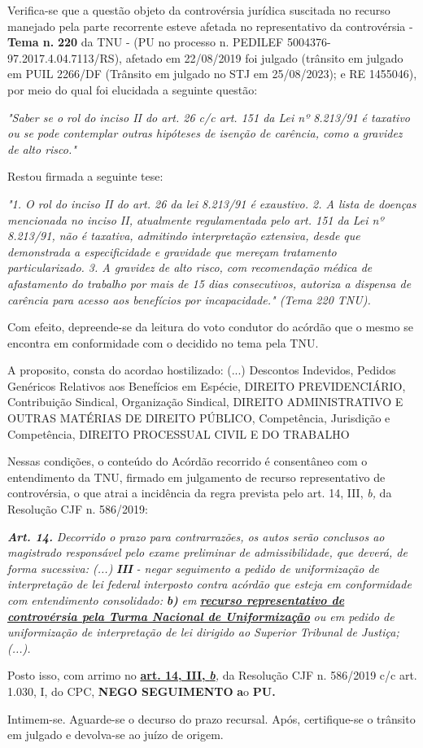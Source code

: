 \documentclass[12pt]{article}
\begin{document}
\justifying
\noindent Verifica-se que a questão objeto da controvérsia jurídica suscitada no recurso manejado pela parte recorrente esteve afetada no representativo da controvérsia - \textbf{Tema n. }\textbf{220} da TNU - (PU no processo n. PEDILEF 5004376-97.2017.4.04.7113/RS),  afetado em 22/08/2019 foi julgado (trânsito em julgado em PUIL 2266/DF (Trânsito em julgado no STJ em 25/08/2023);   e RE 1455046), por meio do qual foi elucidada a seguinte questão:

\noindent \textit{"Saber se o rol do inciso II do art. 26 c/c art. 151 da Lei nº 8.213/91 é taxativo ou se pode contemplar outras hipóteses de isenção de carência, como a gravidez de alto risco."}

\noindent Restou firmada a seguinte tese:

\noindent \textit{"1. O rol do inciso II do art. 26 da lei 8.213/91 é exaustivo. 2. A lista de doenças mencionada no inciso II, atualmente regulamentada pelo art. 151 da Lei nº 8.213/91, não é taxativa, admitindo interpretação extensiva, desde que demonstrada a especificidade e gravidade que mereçam tratamento particularizado. 3. A gravidez de alto risco, com recomendação médica de afastamento do trabalho por mais de 15 dias consecutivos, autoriza a dispensa de carência para acesso aos benefícios por incapacidade." (Tema 220 TNU).}

\noindent Com efeito, depreende-se da leitura do voto condutor do acórdão que o mesmo se encontra em conformidade com o decidido no  tema pela TNU.

\noindent A proposito, consta do acordao hostilizado: (...) Descontos Indevidos, Pedidos Genéricos Relativos aos Benefícios em Espécie, DIREITO PREVIDENCIÁRIO, Contribuição Sindical, Organização Sindical, DIREITO ADMINISTRATIVO E OUTRAS MATÉRIAS DE DIREITO PÚBLICO, Competência, Jurisdição e Competência, DIREITO PROCESSUAL CIVIL E DO TRABALHO

\noindent Nessas condições, o conteúdo do Acórdão recorrido é consentâneo com o entendimento da TNU, firmado em julgamento de recurso representativo de controvérsia, o que atrai a incidência da regra prevista pelo art. 14, III, \textit{b,} da Resolução CJF n. 586/2019:

\noindent \textit{\textbf{Art. 14.}}\textit{ Decorrido o prazo para contrarrazões, os autos serão conclusos ao magistrado responsável pelo exame preliminar de admissibilidade, que deverá, de forma sucessiva: (...) }\textit{\textbf{III }}\textit{- negar seguimento a pedido de uniformização de interpretação de lei federal interposto contra acórdão que esteja em conformidade com entendimento consolidado: }\textit{\textbf{b)}}\textit{ em }\uline{\textit{\textbf{recurso representativo de controvérsia pela Turma Nacional de Uniformização}}}\textit{ ou em pedido de uniformização de interpretação de lei dirigido ao Superior Tribunal de Justiça;(...).}

\noindent Posto isso, com arrimo no \uline{\textbf{art. 14, III, }}\uline{\textit{\textbf{b}}}\textit{,} da Resolução CJF n. 586/2019 c/c art. 1.030, I, do CPC, \textbf{NEGO SEGUIMENTO }\textbf{a}o\textbf{ PU}\textbf{.}

\noindent Intimem-se. Aguarde-se o decurso do prazo recursal. Após, certifique-se o trânsito em julgado e devolva-se ao juízo de origem.
\end{document}
